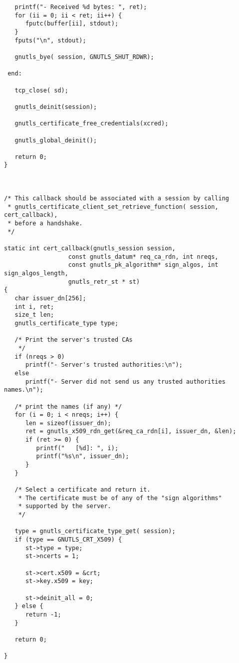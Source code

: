 \begin{verbatim}
   printf("- Received %d bytes: ", ret);
   for (ii = 0; ii < ret; ii++) {
      fputc(buffer[ii], stdout);
   }
   fputs("\n", stdout);

   gnutls_bye( session, GNUTLS_SHUT_RDWR);

 end:

   tcp_close( sd);

   gnutls_deinit(session);

   gnutls_certificate_free_credentials(xcred);

   gnutls_global_deinit();

   return 0;
}



/* This callback should be associated with a session by calling
 * gnutls_certificate_client_set_retrieve_function( session, cert_callback),
 * before a handshake.
 */

static int cert_callback(gnutls_session session,
                  const gnutls_datum* req_ca_rdn, int nreqs,
                  const gnutls_pk_algorithm* sign_algos, int sign_algos_length,
                  gnutls_retr_st * st)
{
   char issuer_dn[256];
   int i, ret;
   size_t len;
   gnutls_certificate_type type;

   /* Print the server's trusted CAs
    */
   if (nreqs > 0)
      printf("- Server's trusted authorities:\n");
   else
      printf("- Server did not send us any trusted authorities names.\n");

   /* print the names (if any) */
   for (i = 0; i < nreqs; i++) {
      len = sizeof(issuer_dn);
      ret = gnutls_x509_rdn_get(&req_ca_rdn[i], issuer_dn, &len);
      if (ret >= 0) {
         printf("   [%d]: ", i);
         printf("%s\n", issuer_dn);
      }
   }

   /* Select a certificate and return it.
    * The certificate must be of any of the "sign algorithms"
    * supported by the server.
    */

   type = gnutls_certificate_type_get( session);
   if (type == GNUTLS_CRT_X509) {
      st->type = type;
      st->ncerts = 1;

      st->cert.x509 = &crt;
      st->key.x509 = key;

      st->deinit_all = 0;
   } else {
      return -1;
   }

   return 0;

}

\end{verbatim}
